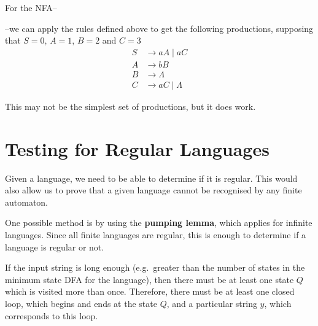 \begin{example*}{}{}
  For the NFA--
  \begin{center}
  \end{center}

  --we can apply the rules defined above to get the following productions, supposing that $S=0$, $A=1$, $B=2$ and $C=3$
  \begin{align*}
    S &\rightarrow aA \mid aC\\
    A &\rightarrow bB\\
    B &\rightarrow \Lambda\\
    C &\rightarrow aC \mid \Lambda
  \end{align*}

  This may not be the simplest set of productions, but it does work.
\end{example*}

\section*{Testing for Regular Languages}

Given a language, we need to be able to determine if it is regular. This would also allow us to prove that a given
 language cannot be recognised by any finite automaton.

One possible method is by using the \textbf{pumping lemma}, which applies for infinite languages. Since all finite
 languages are regular, this is enough to determine if a language is regular or not.

If the input string is long enough (e.g.\ greater than the number of states in the minimum state DFA for the language),
 then there must be at least one state $Q$ which is visited more than once. Therefore, there must be at least one closed
 loop, which begins and ends at the state $Q$, and a particular string $y$, which corresponds to this loop.

